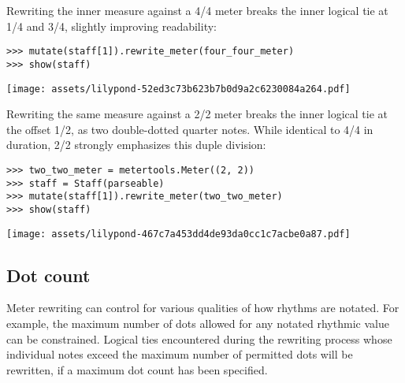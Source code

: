 \noindent Rewriting the inner measure against a 4/4 meter breaks the inner
logical tie at 1/4 and 3/4, slightly improving readability:

\begin{comment}
<abjad>
mutate(staff[1]).rewrite_meter(four_four_meter)
show(staff)
</abjad>
\end{comment}

\begin{singlespacing}
\vspace{-0.5\baselineskip}
\begin{lstlisting}
>>> mutate(staff[1]).rewrite_meter(four_four_meter)
>>> show(staff)
\end{lstlisting}
\noindent\texttt{[image: assets/lilypond-52ed3c73b623b7b0d9a2c6230084a264.pdf]}
\end{singlespacing}

\noindent Rewriting the same measure against a 2/2 meter breaks the inner
logical tie at the offset 1/2, as two double-dotted quarter notes. While
identical to 4/4 in duration, 2/2 strongly emphasizes this duple division:

\begin{comment}
<abjad>
two_two_meter = metertools.Meter((2, 2))
staff = Staff(parseable)
mutate(staff[1]).rewrite_meter(two_two_meter)
show(staff)
</abjad>
\end{comment}

\begin{singlespacing}
\vspace{-0.5\baselineskip}
\begin{lstlisting}
>>> two_two_meter = metertools.Meter((2, 2))
>>> staff = Staff(parseable)
>>> mutate(staff[1]).rewrite_meter(two_two_meter)
>>> show(staff)
\end{lstlisting}
\noindent\texttt{[image: assets/lilypond-467c7a453dd4de93da0cc1c7acbe0a87.pdf]}
\end{singlespacing}

\subsection{Dot count} %

Meter rewriting can control for various qualities of how rhythms are notated.
For example, the maximum number of dots allowed for any notated rhythmic value
can be constrained. Logical ties encountered during the rewriting process whose
individual notes exceed the maximum number of permitted dots will be rewritten,
if a maximum dot count has been specified.

